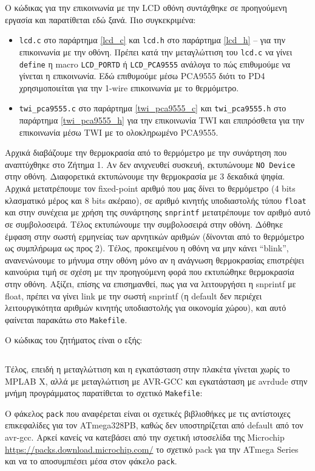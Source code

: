 \documentclass[a4paper]{article}
\begin{document}
\par Ο κώδικας για την επικοινωνία με την LCD οθόνη συντάχθηκε σε προηγούμενη εργασία και παρατίθεται εδώ ξανά. Πιο συγκεκριμένα:
\begin{itemize}
	\item \texttt{lcd.c} στο παράρτημα \ref{lcd_c} και \texttt{lcd.h} στο παράρτημα \ref{lcd_h} -- για την επικοινωνία με την οθόνη.
	Πρέπει κατά την μεταγλώττιση του \texttt{lcd.c} να γίνει \texttt{define} η macro \texttt{LCD\_PORTD} ή \texttt{LCD\_PCA9555} ανάλογα
	το πώς επιθυμούμε να γίνεται η επικοινωνία. Εδώ επιθυμούμε μέσω PCA9555 διότι το PD4 χρησιμοποιείται για την 1-wire επικοινωνία με το θερμόμετρο.
	\item \texttt{twi\_pca9555.c} στο παράρτημα \ref{twi_pca9555_c} και \texttt{twi\_pca9555.h} στο παράρτημα \ref{twi_pca9555_h}
	για την επικοινωνία TWI και επιπρόσθετα για την επικοινωνία μέσω TWI με το ολοκληρωμένο PCA9555.
\end{itemize}

\par Αρχικά διαβάζουμε την θερμοκρασία από το θερμόμετρο με την συνάρτηση που αναπτύχθηκε στο Ζήτημα 1. Αν δεν ανιχνευθεί συσκευή, εκτυπώνουμε \texttt{NO Device}
στην οθόνη. Διαφορετικά εκτυπώνουμε την θερμοκρασία με 3 δεκαδικά ψηφία. Αρχικά μετατρέπουμε τον fixed-point αριθμό που μας δίνει το θερμόμετρο (4 bits κλασματικό
μέρος και 8 bits ακέραιο), σε αριθμό κινητής υποδιαστολής τύπου \texttt{float} και στην συνέχεια με χρήση της συνάρτησης \texttt{snprintf} μετατρέπουμε τον αριθμό
αυτό σε συμβολοσειρά. Τέλος εκτυπώνουμε την συμβολοσειρά στην οθόνη. Δόθηκε έμφαση στην σωστή ερμηνείας των αρνητικών αριθμών (δίνονται από το θερμόμετρο ως
συμπλήρωμα ως προς 2). Τέλος, προκειμένου η οθόνη να μην κάνει ``blink'', ανανενώνουμε το μήνυμα στην οθόνη μόνο αν η ανάγνωση θερμοκρασίας επιστρέψει καινούρια
τιμή σε σχέση με την προηγούμενη φορά που εκτυπώθηκε θερμοκρασία στην οθόνη. Αξίζει, επίσης να επισημανθεί, πως για να λειτουργήσει η snprintf με float,
πρέπει να γίνει link με την σωστή snprintf (η default δεν περιέχει λειτουργικότητα αριθμών κινητής υποδιαστολής για οικονομία χώρου), και αυτό φαίνεται παρακάτω
στο \texttt{Makefile}.

\par Ο κώδικας του ζητήματος είναι ο εξής:
\inputminted[breaklines, linenos]{c}{../Lab7.2/main.c}

\pagebreak

\par Τέλος, επειδή η μεταγλώττιση και η εγκατάσταση στην πλακέτα γίνεται χωρίς το MPLAB X, αλλά με μεταγλώττιση με AVR-GCC και εγκατάσταση με avrdude στην
μνήμη προγράμματος παρατίθεται το σχετικό \texttt{Makefile}:
\par Ο φάκελος \texttt{pack} που αναφέρεται είναι οι σχετικές βιβλιοθήκες με τις αντίστοιχες επικεφαλίδες
για τον ATmega328PB, καθώς δεν υποστηρίζεται από default από τον avr-gcc. Αρκεί κανείς να κατεβάσει από την σχετική ιστοσελίδα της Microchip
\url{https://packs.download.microchip.com/} το σχετικό pack για την ATmega Series και να το αποσυμπιέσει μέσα στον φάκελο \texttt{pack}.
\end{document}
